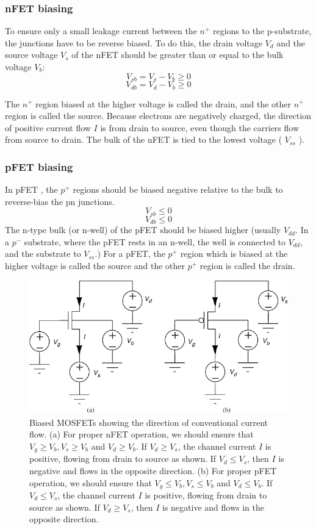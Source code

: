 \documentclass[main]{subfiles}
\begin{document}
\subsubsection{nFET biasing}
To ensure only a small leakage current between the $n^+$ regions to the p-substrate, the junctions have to be reverse biased.
To do this, the drain voltage $V_d$ and the source voltage $V_s$ of the nFET should be greater than or equal to the bulk voltage $V_b$:
\[V_{sb}=V_s-V_b \geq 0\]
\[V_{db}=V_d-V_b \geq 0\]


The $n^+$ region biased at the higher voltage is called the drain, and the other $n^+$ region is called the source. Because electrons are negatively charged, the direction of positive current flow $I$ is from drain to source, even though the carriers flow from source to drain. The bulk of the nFET is tied to the lowest voltage ( $V_{ss}$ ). \cite{book:VLSI}

\subsubsection{pFET biasing}
In pFET , the $p^+$ regions should be biased negative relative to the bulk to reverse-bias the pn junctions.
\[V_{sb} \leq 0\]
\[V_{db} \leq 0\]
The n-type bulk (or n-well) of the pFET should be biased higher (usually $V_{dd}$.  In a $p^-$ substrate, where the pFET rests in an n-well, the well is connected to $V_{dd}$, and the substrate to $V_{ss}$.) For a pFET, the $p^+$ region which is biased at the higher voltage is called the source and the other $p^+$ region is called the drain.

\begin{figure}[H]
\centering
\includegraphics[width=0.8\linewidth]{figs/nFET-pFET-operation.pdf}
\caption{Biased MOSFETs showing the direction of conventional current flow. (a) For proper nFET operation, we should ensure that $V_g \geq V_b, V_s \geq V_b $ and $V_d \geq V_b$. If $V_d \geq V_s$, the channel current $I$ is positive, flowing from drain to source as shown. If $V_d \leq V_s$, then $I$ is negative and flows in the opposite direction. (b) For proper pFET operation, we should ensure that $V_g \leq V_b, V_s \leq V_b $ and $V_d \leq V_b$. If $V_d \leq V_s$, the channel current $I$ is positive, flowing from drain to source as shown. If $V_d \geq V_s$, then $I$ is negative and flows in the opposite direction.}
\end{figure}
\end{document}

